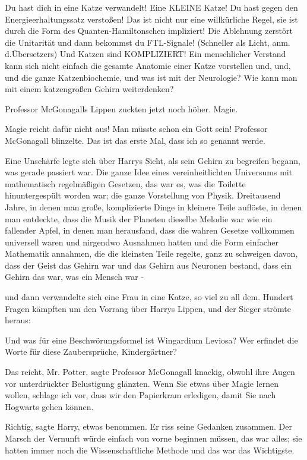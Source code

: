 \glqq{}Du hast dich in eine Katze verwandelt! Eine KLEINE Katze! Du hast gegen
den Energieerhaltungssatz verstoßen! Das ist nicht nur eine willkürliche Regel,
sie ist durch die Form des Quanten-Hamiltonschen impliziert! Die Ablehnung
zerstört die Unitarität und dann bekommst du FTL-Signale! (Schneller als Licht,
anm. d.Übersetzers) Und Katzen sind KOMPLIZIERT! Ein menschlicher Verstand kann
sich nicht einfach die gesamte Anatomie einer Katze vorstellen und, und, und die
ganze Katzenbiochemie, und was ist mit der Neurologie? Wie kann man mit einem
katzengroßen Gehirn weiterdenken?\grqq{}

Professor McGonagalls Lippen zuckten jetzt noch höher. \glqq{}Magie.\grqq{}

\glqq{}Magie reicht dafür nicht aus! Man müsste schon ein Gott sein!\grqq{}
Professor McGonagall blinzelte. \glqq{}Das ist das erste Mal, dass ich so genannt
werde.\grqq{}

Eine Unschärfe legte sich über Harrys Sicht, als sein Gehirn zu begreifen
begann, was gerade passiert war. Die ganze Idee eines vereinheitlichten
Universums mit mathematisch regelmäßigen Gesetzen, das war es, was die Toilette
hinuntergespült worden war; die ganze Vorstellung von Physik. Dreitausend Jahre,
in denen man große, komplizierte Dinge in kleinere Teile auflöste, in denen man
entdeckte, dass die Musik der Planeten dieselbe Melodie war wie ein fallender
Apfel, in denen man herausfand, dass die wahren Gesetze vollkommen universell
waren und nirgendwo Ausnahmen hatten und die Form einfacher Mathematik annahmen,
die die kleinsten Teile regelte, ganz zu schweigen davon, dass der Geist das
Gehirn war und das Gehirn aus Neuronen bestand, dass ein Gehirn das war, was ein
Mensch war -

und dann verwandelte sich eine Frau in eine Katze, so viel zu all dem. Hundert
Fragen kämpften um den Vorrang über Harrys Lippen, und der Sieger strömte
heraus:

\glqq{}Und was für eine Beschwörungsformel ist Wingardium Leviosa? Wer erfindet
die Worte für diese Zaubersprüche, Kindergärtner?\grqq{}

\glqq{}Das reicht, Mr. Potter\grqq{}, sagte Professor McGonagall knackig, obwohl
ihre Augen vor unterdrückter Belustigung glänzten. \glqq{}Wenn Sie etwas über
Magie lernen wollen, schlage ich vor, dass wir den Papierkram erledigen, damit
Sie nach Hogwarts gehen können.\grqq{}

\glqq{}Richtig\grqq{}, sagte Harry, etwas benommen. Er riss seine Gedanken
zusammen. Der Marsch der Vernunft würde einfach von vorne beginnen müssen, das
war alles; sie hatten immer noch die Wissenschaftliche Methode und das war das
Wichtigste.

